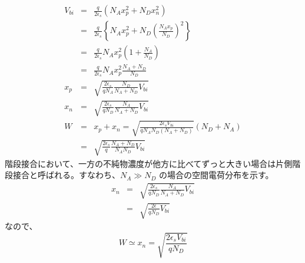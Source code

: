 \documentclass[10pt]{ujarticle}
\begin{document}
\begin{eqnarray}
  V_{bi} &=& \frac{q}{2\epsilon_s} (N_A x^2_p + N_D x^2_n) \nonumber \\
  &=& \frac{q}{2\epsilon_s} \left\{ N_A x^2_p + N_D \left( \frac{N_A x_p}{N_D} \right)^2 \right\} \nonumber \\
  &=& \frac{q}{2\epsilon_s} N_A x^2_p \left( 1+ \frac{N_A}{N_D} \right) \nonumber \\
  &=& \frac{q}{2 \epsilon_s} N_A x^2_p \frac{N_A + N_D}{N_D}  \\
  x_p &=& \sqrt{\frac{2\epsilon_s}{qN_A} \frac{N_D}{N_A + N_D} V_{bi}} \\
  x_n &=& \sqrt{\frac{2\epsilon_s}{qN_D} \frac{N_A}{N_A + N_D} V_{bi}}\\
  W &=& x_p + x_n = \sqrt{\frac{2\epsilon_s V_{bi}}{qN_AN_D(N_A + N_D)}} (N_D + N_A)\nonumber \\
    &=& \sqrt{\frac{2\epsilon_s}{q} \frac{N_A + N_D}{N_A N_D} V_{bi}}
\end{eqnarray}
階段接合において、一方の不純物濃度が他方に比べてずっと大きい場合は片側階段接合と呼ばれる。すなわち、$N_A \gg N_D$ の場合の空間電荷分布を示す。
\begin{eqnarray}
  x_n &=& \sqrt{\frac{2\epsilon_s}{qN_D} \frac{N_A}{N_A + N_D} V_{bi}}\\
  &=& \sqrt{\frac{2\epsilon}{qN_D} V_{bi}}
\end{eqnarray}
なので、
\begin{equation}
  W \simeq x_n = \sqrt{\frac{2 \epsilon_s V_{bi}}{qN_D}}
\end{equation}
\end{document}

